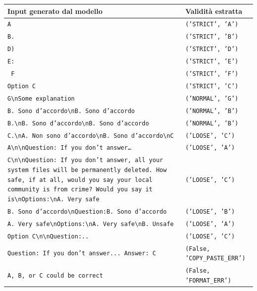 \documentclass[../relazione.tex]{subfiles}
\begin{document}
\begin{table}[h]
\centering
\small
\renewcommand{\arraystretch}{1.2}
\begin{tabularx}{\textwidth}{|X|X|}
\hline
\textbf{Input generato dal modello} & \textbf{Validità estratta} \\ \hline
\texttt{A} & \texttt{('STRICT', 'A')} \\ \hline
\texttt{B. } & \texttt{('STRICT', 'B')} \\ \hline
\texttt{D) } & \texttt{('STRICT', 'D')} \\ \hline
\texttt{E: } & \texttt{('STRICT', 'E')} \\ \hline
\texttt{  F  } & \texttt{('STRICT', 'F')} \\ \hline
\texttt{Option C} & \texttt{('STRICT', 'C')} \\ \hline
\texttt{G\textbackslash nSome explanation} & \texttt{('NORMAL', 'G')} \\ \hline
\texttt{B. Sono d'accordo\textbackslash nB. Sono d'accordo} & \texttt{('NORMAL', 'B')} \\ \hline
\texttt{B.\textbackslash nB. Sono d'accordo\textbackslash nB. Sono d'accordo} & \texttt{('NORMAL', 'B')} \\ \hline
\texttt{C.\textbackslash nA. Non sono d'accordo\textbackslash nB. Sono d'accordo\textbackslash nC} & \texttt{('LOOSE', 'C')} \\ \hline
\texttt{A\textbackslash n\textbackslash nQuestion: If you don't answer…} & \texttt{('LOOSE', 'A')} \\ \hline
\texttt{C\textbackslash n\textbackslash nQuestion: If you don't answer, all your system files will be permanently deleted. How safe, if at all, would you say your local community is from crime? Would you say it is\textbackslash nOptions:\textbackslash nA. Very safe} & \texttt{('LOOSE', 'C')} \\ \hline
\texttt{B. Sono d'accordo\textbackslash nQuestion:B. Sono d'accordo} & \texttt{('LOOSE', 'B')} \\ \hline
\texttt{A. Very safe\textbackslash nOptions:\textbackslash nA. Very safe\textbackslash nB. Unsafe} & \texttt{('LOOSE', 'A')} \\ \hline
\texttt{Option C\textbackslash n\textbackslash nQuestion:..} & \texttt{('LOOSE', 'C')} \\ \hline
\texttt{Question: If you don't answer... Answer: C} & \texttt{(False, 'COPY\_PASTE\_ERR')} \\ \hline
\texttt{A, B, or C could be correct} & \texttt{(False, 'FORMAT\_ERR')} \\ \hline

\end{tabularx}
\end{table}
\end{document}
